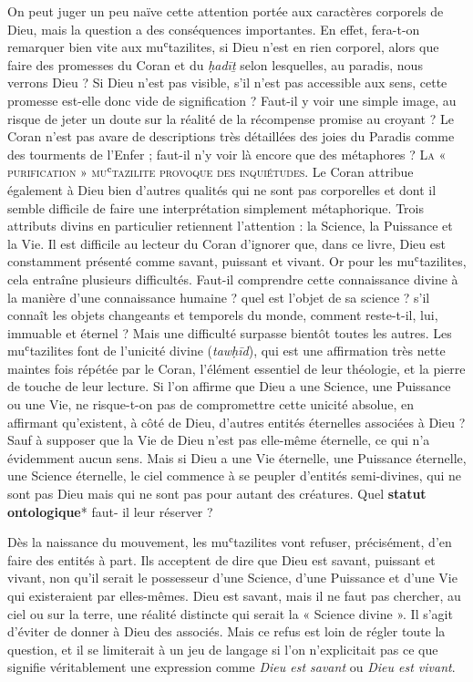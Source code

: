 On peut juger un peu naïve cette attention portée aux caractères
corporels de Dieu, mais la question a des conséquences importantes. En
effet, fera-t-on remarquer bien vite aux muʿtazilites, si Dieu n'est en
rien corporel, alors que faire des promesses du Coran et du \emph{ḥadīṯ}
selon lesquelles, au paradis, nous verrons Dieu ? Si Dieu n'est pas
visible, s'il n'est pas accessible aux sens, cette promesse est-elle
donc vide de signification ? Faut-il y voir une simple image, au risque
de jeter un doute sur la réalité de la récompense promise au croyant ?
Le Coran n'est pas avare de descriptions très détaillées des joies du
Paradis comme des
tourments de l'Enfer ; faut-il n'y voir là encore que des métaphores ?
\textsc{La « purification »
muʿtazilite provoque des inquiétudes.
}
Le Coran attribue également à Dieu bien d'autres qualités qui ne sont
pas corporelles et dont il semble difficile de faire une interprétation
simplement métaphorique. Trois attributs divins en particulier
retiennent l'attention : la Science, la Puissance et la Vie. Il est
difficile au lecteur du Coran d'ignorer que, dans ce livre, Dieu est
constamment présenté comme savant, puissant et vivant. Or pour les
muʿtazilites, cela entraîne plusieurs difficultés. Faut-il comprendre
cette connaissance divine à la manière d'une connaissance humaine ? quel
est l'objet de sa science ? s'il connaît les objets changeants et
temporels du monde, comment reste-t-il, lui, immuable et éternel ? Mais
une difficulté surpasse bientôt toutes les autres. Les muʿtazilites font
de l'unicité divine (\emph{tawḥīd}), qui est une affirmation très nette
maintes fois répétée par le Coran, l'élément essentiel de leur
théologie, et la pierre de touche de leur lecture. Si l'on affirme que
Dieu a une Science, une Puissance ou une Vie, ne risque-t-on pas de
compromettre cette unicité absolue, en affirmant qu'existent, à côté de
Dieu, d'autres entités éternelles associées à Dieu ? Sauf à supposer que
la Vie de Dieu n'est pas elle-même éternelle, ce qui n'a évidemment
aucun sens. Mais si Dieu a une Vie éternelle, une Puissance éternelle,
une Science éternelle, le ciel commence à se peupler d'entités
semi-divines, qui ne sont pas Dieu mais qui ne sont pas pour autant des
créatures. Quel \textbf{statut ontologique}* faut- il leur réserver ?

Dès la naissance du mouvement, les muʿtazilites vont refuser,
précisément, d'en faire des entités à part. Ils acceptent de dire que
Dieu est savant, puissant et vivant, non qu'il serait le possesseur
d'une Science, d'une Puissance et d'une Vie qui existeraient par
elles-mêmes. Dieu est savant, mais il ne faut pas chercher, au ciel ou
sur la terre, une réalité distincte qui serait la « Science divine ». Il
s'agit d'éviter de donner à Dieu des associés. Mais ce refus est loin de
régler toute la question, et il se limiterait à un jeu de langage si
l'on n'explicitait pas ce que signifie véritablement une expression
comme \emph{Dieu est savant} ou \emph{Dieu est vivant}.

